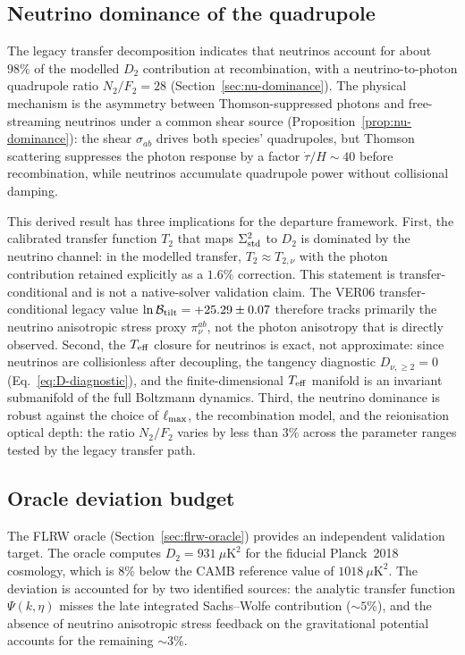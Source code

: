 \subsection{Neutrino dominance of the quadrupole}
\label{sec:disc-nu-dom}

The legacy transfer decomposition indicates that neutrinos account
for about $98\%$ of the modelled $D_2$ contribution at
recombination, with a neutrino-to-photon quadrupole ratio
$N_2/F_2 = 28$
(Section~\ref{sec:nu-dominance}).  The physical mechanism
is the asymmetry between Thomson-suppressed photons and
free-streaming neutrinos under a common shear source
(Proposition~\ref{prop:nu-dominance}): the shear
$\sigma_{ab}$ drives both species' quadrupoles, but
Thomson scattering suppresses the photon response by a
factor $\dot{\tau}/H \sim 40$ before recombination, while
neutrinos accumulate quadrupole power without collisional
damping.

This derived result has three implications for the departure
framework.  First, the calibrated transfer function $T_2$
that maps $\Sigma^2_{\mathrm{std}}$ to $D_2$ is dominated by the neutrino
channel: in the modelled transfer,
$T_2 \approx T_{2,\nu}$ with the photon contribution retained
explicitly as a $1.6\%$ correction.  This statement is
transfer-conditional and is not a native-solver validation claim.
The VER06 transfer-conditional legacy value
$\ln \mathcal{B}_{\rm tilt} = +25.29 \pm 0.07$ therefore
tracks primarily the neutrino anisotropic stress proxy
$\pi_\nu^{ab}$, not the photon anisotropy that is directly
observed.  Second, the
$T_{\mathrm{eff}}$ closure for neutrinos is exact, not approximate:
since neutrinos are collisionless after decoupling, the
tangency diagnostic $D_{\nu,\geq 2} = 0$
(Eq.~\ref{eq:D-diagnostic}), and the finite-dimensional
$T_{\mathrm{eff}}$ manifold is an invariant submanifold of the full
Boltzmann dynamics.  Third, the neutrino dominance is
robust against the choice of $\ell_{\rm max}$, the
recombination model, and the reionisation optical depth:
the ratio $N_2/F_2$ varies by less than $3\%$ across the
parameter ranges tested by the legacy transfer path.


\subsection{Oracle deviation budget}
\label{sec:disc-oracle}
\label{sec:oracle-deviation}

The FLRW oracle (Section~\ref{sec:flrw-oracle}) provides
an independent validation target.  The oracle computes
$D_2 = 931~\mu\mathrm{K}^2$ for the fiducial Planck~2018
cosmology, which is $8\%$ below the CAMB reference value
of $1018~\mu\mathrm{K}^2$.  The deviation is accounted for
by two identified sources: the analytic transfer function
$\Psi(k, \eta)$ misses the late integrated Sachs--Wolfe
contribution ($\sim\!5\%$), and the absence of neutrino
anisotropic stress feedback on the gravitational potential
accounts for the remaining $\sim\!3\%$.

